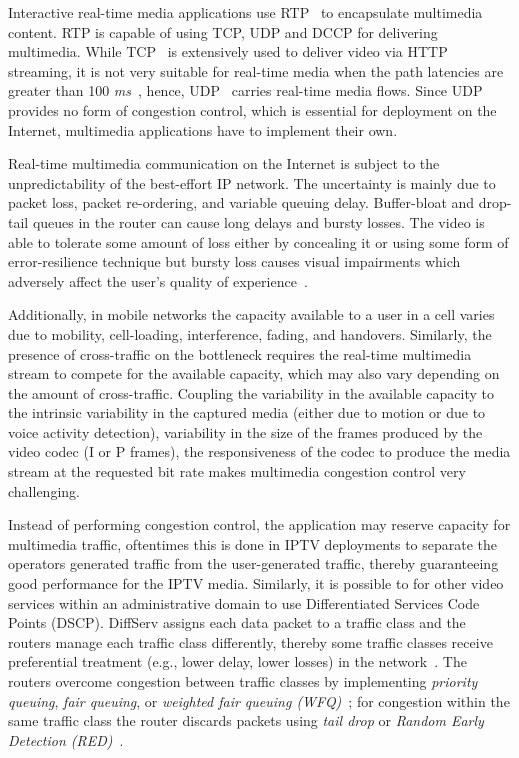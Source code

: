 Interactive real-time media applications use RTP~\cite{rfc3550} to encapsulate
multimedia content. RTP is capable of using TCP, UDP and DCCP for delivering
multimedia.  While TCP~\cite{rfc793} is extensively used to deliver video via
HTTP streaming, it is not very suitable for real-time media when the path
latencies  are greater than 100 \emph{ms}~\cite{Brosh:tcp-real-time}, hence,
UDP~\cite{rfc768} carries real-time media flows. Since UDP provides no form of
congestion control, which is essential for deployment on the Internet,
multimedia applications have to implement their own. 

Real-time multimedia communication on the Internet is subject to the
unpredictability of the best-effort IP network. The uncertainty is mainly due
to packet loss, packet re-ordering, and variable queuing delay.  Buffer-bloat
\cite{gettys:bufferbloat} and drop-tail queues in the router  can cause long
delays and bursty losses. The video is able to tolerate some amount of loss
either by concealing it or using some form of error-resilience technique but
bursty loss causes visual impairments which adversely affect the user's
quality of experience~\cite{Zink03subjectiveimpression}.

Additionally, in mobile networks  the capacity available to a user in a cell
varies due to mobility, cell-loading, interference, fading, and handovers.
Similarly, the presence of cross-traffic on the bottleneck requires the real-time 
multimedia stream to compete for the available capacity, which may also
vary depending on the amount of cross-traffic.  Coupling the variability in
the available capacity to  the intrinsic variability in the captured media
(either due to motion or due  to voice activity detection), variability in the
size of the frames produced  by the video codec (I or P frames), the
responsiveness of the codec to produce the media stream at the requested bit
rate makes multimedia congestion control very challenging.

Instead of performing congestion control, the application may reserve capacity
for multimedia traffic, oftentimes this is done in IPTV deployments to
separate the operators generated traffic from the user-generated traffic,
thereby guaranteeing good performance for the IPTV media. Similarly, it is
possible to for other video services within an administrative domain to use
Differentiated Services Code Points (DSCP). DiffServ assigns each data packet
to a traffic class and the routers manage each traffic class differently,
thereby some traffic classes receive preferential treatment (e.g., lower
delay, lower losses) in the network~\cite{rfc2475}. The routers overcome
congestion between traffic classes by implementing \emph{priority queuing},
\emph{fair queuing}, or \emph{weighted fair queuing (WFQ)}~\cite{rfc4594}; for
congestion within the same traffic class the router discards packets using
\emph{tail drop} or \emph{Random Early Detection (RED)}~\cite{Floyd:RED}.

